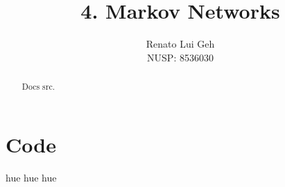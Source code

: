 \documentclass{amsart}
\title[]{4. Markov Networks}
\author[]{Renato Lui Geh\\NUSP\@: 8536030}
\theoremstyle{plain}
\begin{document}
\begin{abstract}
  Docs src.
  \vspace*{-2.5em}
\end{abstract}

\maketitle

\section{Code}

hue hue hue

\newpage

\printbibliography[]
\end{document}
